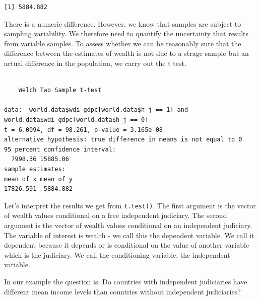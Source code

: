 \documentclass[]{article}
\newenvironment{Shaded}{\begin{snugshade}}{\end{snugshade}}
\newcommand{\DataTypeTok}[1]{\textcolor[rgb]{0.13,0.29,0.53}{#1}}
\newcommand{\DecValTok}[1]{\textcolor[rgb]{0.00,0.00,0.81}{#1}}
\newcommand{\FloatTok}[1]{\textcolor[rgb]{0.00,0.00,0.81}{#1}}
\newcommand{\KeywordTok}[1]{\textcolor[rgb]{0.13,0.29,0.53}{\textbf{#1}}}
\newcommand{\NormalTok}[1]{#1}
\newcommand{\OperatorTok}[1]{\textcolor[rgb]{0.81,0.36,0.00}{\textbf{#1}}}
\newcommand{\StringTok}[1]{\textcolor[rgb]{0.31,0.60,0.02}{#1}}
\begin{document}
\begin{verbatim}
[1] 5884.882
\end{verbatim}

There is a numeric difference. However, we know that samples are subject to sampling variability. We therefore need to quantify the uncertainty that results from variable samples. To assess whether we can be reasonably sure that the difference between the estimates of wealth is not due to a strage sample but an actual difference in the population, we carry out the t test.

\begin{Shaded}
\end{Shaded}

\begin{verbatim}

    Welch Two Sample t-test

data:  world.data$wdi_gdpc[world.data$h_j == 1] and world.data$wdi_gdpc[world.data$h_j == 0]
t = 6.0094, df = 98.261, p-value = 3.165e-08
alternative hypothesis: true difference in means is not equal to 0
95 percent confidence interval:
  7998.36 15885.06
sample estimates:
mean of x mean of y 
17826.591  5884.882 
\end{verbatim}

Let's interpret the results we get from \texttt{t.test()}. The first argument is the vector of wealth values conditional on a free independent judiciary. The second argument is the vector of wealth values conditional on an independent judiciary. The variable of interest is wealth - we call this the dependent variable. We call it dependent because it depends or is conditional on the value of another variable which is the judiciary. We call the conditioning variable, the independent variable.

In our example the question is: Do countries with independent judiciaries have different mean income levels than countries without independent judiciaries?
\end{document}
